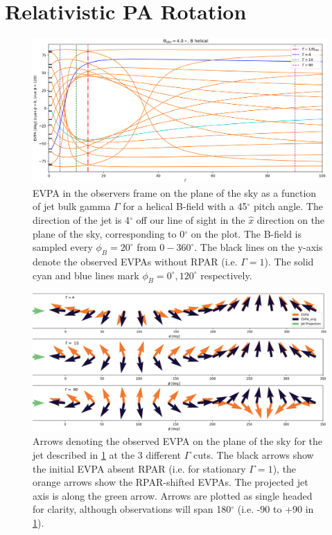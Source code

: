 \section{Relativistic PA Rotation}
\begin{figure}[ht]
\label{fig:f2}
  \centering
  \includegraphics[width=1.0\textwidth]{figures/f2.eps}
  \caption{EVPA in the observers frame on the plane of the sky as a function of jet bulk gamma $\Gamma$ for a helical B-field with a 45$^{\circ}$ pitch angle. The direction of the jet is 4$^{\circ}$ off our line of sight in the $\hat{x}$ direction on the plane of the sky, corresponding to 0$^{\circ}$ on the plot. The B-field is sampled every $\phi_B =20^{\circ}$ from $0 - 360^{\circ}$. The black lines on the y-axis denote the observed EVPAs without RPAR (i.e. $\Gamma = 1$). The solid cyan and blue lines mark $\phi_B =0^{\circ},120^{\circ}$ respectively.}
\end{figure}
\begin{figure}[ht]
\label{fig:f3}
  \centering
  \includegraphics[width=1.0\textwidth,]{figures/f3.eps}
  \caption{Arrows denoting the observed EVPA on the plane of the sky for the jet described in \cref{fig:f2} at the 3 different $\Gamma$ cuts. The black arrows show the initial EVPA absent RPAR (i.e. for stationary $\Gamma = 1$), the orange arrows show the RPAR-shifted EVPAs. The projected jet axis is along the green arrow. Arrows are plotted as single headed for clarity, although observations will span 180$^\circ$ (i.e. -90 to +90 in \cref{fig:f2}).}
\end{figure}

